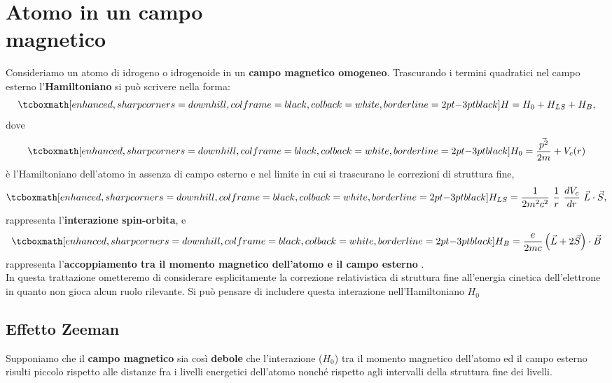 \chapter[Atomo in un campo magnetico]{Atomo in un campo\\magnetico}
Consideriamo un atomo di idrogeno o idrogenoide in un \textbf{campo magnetico omogeneo}. Trascurando i termini quadratici nel campo esterno l'\textbf{Hamiltoniano} si può scrivere nella forma:
	\begin{equation}
	\label{eq:cap24_1}
		\tcboxmath[enhanced, sharp corners=downhill, colframe=black, colback=white, borderline={2pt}{-3pt}{black}]{
			H=H_0+H_{LS}+H_B ,
			}
	\end{equation}
dove
	\begin{equation}
	\label{eq:cap24_2}
		\tcboxmath[enhanced, sharp corners=downhill, colframe=black, colback=white, borderline={2pt}{-3pt}{black}]{
			H_0=\frac{\vec{p^2}}{2m}+V_c(r) 
			}
	\end{equation}
è l'Hamiltoniano dell'atomo in assenza di campo esterno e nel limite in cui si trascurano le correzioni di struttura fine,
	\begin{equation}
	\label{eq:cap24_3}
		\tcboxmath[enhanced, sharp corners=downhill, colframe=black, colback=white, borderline={2pt}{-3pt}{black}]{
			H_{LS}=\frac{1}{2m^2c^2} \ \frac{1}{r} \ \frac{dV_c}{dr} \ \vec{L} \cdot \vec{S} ,
			}
	\end{equation}
rappresenta l'\textbf{interazione spin-orbita}, e
	\begin{equation}
	\label{eq:cap24_4}
		\tcboxmath[enhanced, sharp corners=downhill, colframe=black, colback=white, borderline={2pt}{-3pt}{black}]{
			H_B=\frac{e}{2mc}\left( \vec{L}+2\vec{S} \right) \cdot \vec{B} 
			}
	\end{equation}
rappresenta l'\textbf{accoppiamento tra il momento magnetico dell'atomo e il campo esterno}
. \\

In questa trattazione ometteremo di considerare esplicitamente la correzione relativistica di struttura fine all'energia cinetica dell'elettrone in quanto non gioca alcun ruolo rilevante. Si può pensare di includere questa interazione nell'Hamiltoniano $H_0$

\section{Effetto Zeeman}
Supponiamo che il \textbf{campo magnetico} sia così \textbf{debole} che l'interazione ($H_0$) tra il momento magnetico dell'atomo ed il campo esterno risulti piccolo rispetto alle distanze fra i livelli energetici dell'atomo nonché rispetto agli intervalli della struttura fine dei livelli. \\

